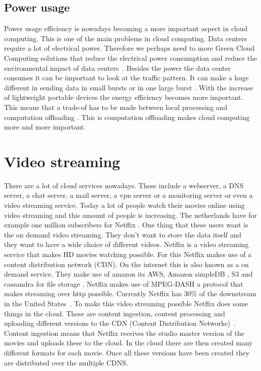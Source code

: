 \documentclass{sig-alternate-br}
\begin{document}
\subsection{Power usage}
Power usage efficiency is nowadays becoming a more important aspect in cloud computing. This is one of the main problems in cloud computing. Data centers require a lot of electrical power. Therefore we perhaps need to more Green Cloud Computing solutions that reduce the electrical power consumption and reduce the environmental impact of data centers~\cite{beloglazov2012energy}. Besides the power the data center consumes it can be important to look at the traffic pattern. It can make a huge different in sending data in small bursts or in one large burst \cite{Miettinen:2010:EEM:1863103.1863107}. With the increase of lightweight portable devices the energy efficiency becomes more important. This means that a trade-of has to be made between local processing and computation offloading \cite{Miettinen:2010:EEM:1863103.1863107}. This is computation offloading makes cloud computing more and more important. 

\section{Video streaming}
There are a lot of cloud services nowadays. These include a webserver, a DNS server, a chat server, a mail server, a vpn server or a monitoring server or even a video streaming service. \newline
Today a lot of people watch their movies online using video streaming and this amount of people is increasing. The netherlands have for example one million subscribers for Netflix \cite{volkskrant}. One thing that these users want is the on demand video streaming. They don't want to store the data itself and they want to have a wide choice of different videos. Netflix is a video streaming service that makes HD movies watching possible. For this Netflix makes use of a content distribution network (CDN). On the internet this is also known as a on demand service. They make use of amazon its AWS, Amazon simpleDB , S3 and cassandra for file storage \cite{Adhikari:2012}. Netflix makes use of MPEG-DASH a protocol that makes streaming over http possible. Currently Netflix has 30\% of the downstream in the United States~\cite{computer-networking}. To make this video streaming possible Netflix does some things in the cloud. These are content ingestion, content processing and uploading different versions to the CDN (Content Distribution Networks)~\cite{Adhikari:2012}. Content ingestion means that Netflix receives the studio master version of the movies and uploads these to the cloud. In the cloud there are then created many different formats for each movie. Once all these versions have been created they are distributed over the multiple CDNS. 
\end{document}
